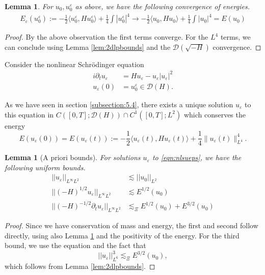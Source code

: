 \documentclass[11pt, oneside]{article}   	%
\newtheorem{lemma}[theorem]{Lemma}
\newcommand{\ED}{\mathscr{D} ( \sqrt{-H})}
\begin{document}
\begin{lemma}\label{lem:energyconv}
	For $u_0,u^\varepsilon_0$ as above, we have the following convergence of energies.
	\begin{align*}
	E_\varepsilon(u^\varepsilon_0):=-\frac{1}{2}\langle u^\varepsilon_0,H u^\varepsilon_0\rangle+\frac{1}{4}\int|u_0^\varepsilon|^4\to-\frac{1}{2}\langle u_0,H u_0\rangle+\frac{1}{4}\int|u_0|^4=E(u_0)
	\end{align*}
\end{lemma}
\begin{proof}
	By the above observation the first terms converge.  For the $L^4$ terms, we can conclude using Lemma \ref{lem:2dlpbounds} and the $\ED$ convergence.

\end{proof}
Consider the nonlinear Schr{\"o}dinger equation
\begin{align} \label{eqn:nlsueps}
i\partial_t u_{\varepsilon} &=  H u_{\varepsilon}-u_\varepsilon|u_\varepsilon|^2  \\ \nonumber
u_\varepsilon(0)&=u^\varepsilon_0\in \mathscr{D}(H). \end{align}

As we have seen in section \ref{subsection:5.4}, there exists a unique solution $u_{\varepsilon}$ to this
equation in $C ([0, T] ; \mathscr{D}(H)) \cap C^1 ([0, T] ; L^2)$ which conserves the
energy
\[ E (u_{\varepsilon} (0))=E (u_{\varepsilon} (t)) := -\frac{1}{2} \langle u_{\varepsilon} (t), H u_{\varepsilon}
(t) \rangle + \frac{1}{4}\| u_{\varepsilon} (t) \|_{L^4}^4 . \]

\begin{lemma}[A priori bounds]\label{lem:energyapriori}
	For solutions $u_\varepsilon$ to \eqref{eqn:nlsueps}, we have the following uniform bounds. 
	\begin{align*}
	||u_\varepsilon||_{L^\infty L^2}&\lesssim||u_0||_{L^2}\\
	||(-H)^{1/2}u_\varepsilon||_{L^\infty L^2}&\lesssim E^{1/2}(u_0)\\
	||(-H)^{-1/2}\partial_t u_\varepsilon||_{L^\infty L^2}&\lesssim_\Xi E^{1/2}(u_0)+E^{3/2}(u_0)
	\end{align*}
\end{lemma}
\begin{proof}
	Since we have conservation of mass and energy, the first and second follow directly, using also Lemma \ref{lem:energyconv} and the positivity of the energy. 
	For the third bound, we use the equation and the fact that \[
	||u_\varepsilon||^3_{L^6}\lesssim_\Xi
	E^{3/2}(u_0),
	\]
	which follows from Lemma \ref{lem:2dlpbounds}. 

\end{proof}
\end{document}
